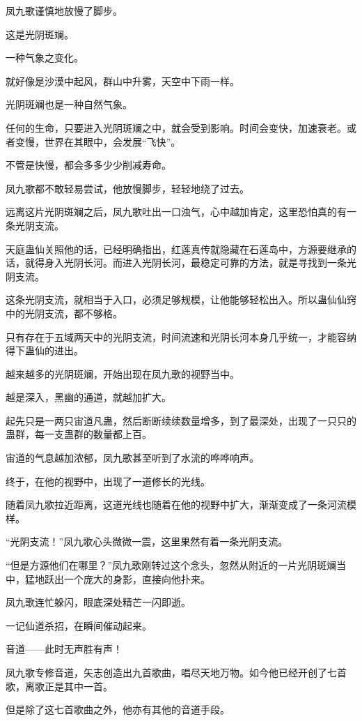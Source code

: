 \begin{this_body}
凤九歌谨慎地放慢了脚步。

这是光阴斑斓。

一种气象之变化。

就好像是沙漠中起风，群山中升雾，天空中下雨一样。

光阴斑斓也是一种自然气象。

任何的生命，只要进入光阴斑斓之中，就会受到影响。时间会变快，加速衰老。或者变慢，世界在其眼中，会发展“飞快”。

不管是快慢，都会多多少少削减寿命。

凤九歌都不敢轻易尝试，他放慢脚步，轻轻地绕了过去。

远离这片光阴斑斓之后，凤九歌吐出一口浊气，心中越加肯定，这里恐怕真的有一条光阴支流。

天庭蛊仙关照他的话，已经明确指出，红莲真传就隐藏在石莲岛中，方源要继承的话，就得身入光阴长河。而进入光阴长河，最稳定可靠的方法，就是寻找到一条光阴支流。

这条光阴支流，就相当于入口，必须足够规模，让他能够轻松出入。所以蛊仙仙窍中的光阴支流，都不够格。

只有存在于五域两天中的光阴支流，时间流速和光阴长河本身几乎统一，才能容纳得下蛊仙的进出。

越来越多的光阴斑斓，开始出现在凤九歌的视野当中。

越是深入，黑幽的通道，就越加扩大。

起先只是一两只宙道凡蛊，然后断断续续数量增多，到了最深处，出现了一只只的蛊群，每一支蛊群的数量都上百。

宙道的气息越加浓郁，凤九歌甚至听到了水流的哗哗响声。

终于，在他的视野中，出现了一道修长的光线。

随着凤九歌拉近距离，这道光线也随着在他的视野中扩大，渐渐变成了一条河流模样。

“光阴支流！”凤九歌心头微微一震，这里果然有着一条光阴支流。

“但是方源他们在哪里？”凤九歌刚转过这个念头，忽然从附近的一片光阴斑斓当中，猛地跃出一个庞大的身影，直接向他扑来。

凤九歌连忙躲闪，眼底深处精芒一闪即逝。

一记仙道杀招，在瞬间催动起来。

音道——此时无声胜有声！

凤九歌专修音道，矢志创造出九首歌曲，唱尽天地万物。如今他已经开创了七首歌，离歌正是其中一首。

但是除了这七首歌曲之外，他亦有其他的音道手段。


\end{this_body}
